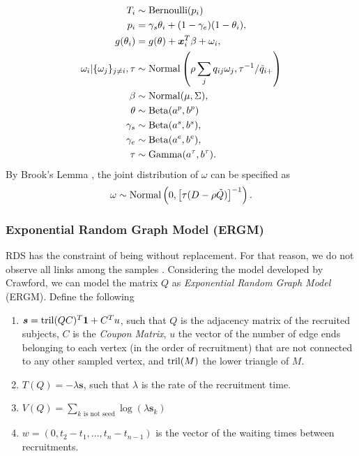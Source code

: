 \begin{equation}
  \begin{aligned}
    T_i &\sim \operatorname{Bernoulli}(p_i) \\
    p_i &= \gamma_s\theta_i + (1-\gamma_e)(1 - \theta_i),  \\
    g(\theta_i) &= g(\theta) + \boldsymbol{x}_i^T\beta + \omega_i,  \\
    \omega_i|\{\omega_j\}_{j\neq i}, \tau &\sim \operatorname{Normal}\left(\rho\sum_j q_{ij}\omega_j, \tau^{-1}/\tilde{q}_{i+}\right) \\
    \beta &\sim \operatorname{Normal}(\mu, \Sigma), \\ 
    \theta &\sim \operatorname{Beta}(a^p, b^p) \\
    \gamma_s &\sim \operatorname{Beta}(a^s, b^s), \\
    \gamma_e &\sim \operatorname{Beta}(a^e, b^e), \\  
    \tau &\sim \operatorname{Gamma}(a^{\tau}, b^{\tau}).
  \end{aligned}  
\end{equation}
By Brook's Lemma \cite[]{brook1964distinction}, the joint distribution of
$\omega$ can be specified as 
$$
\omega \sim \operatorname{Normal}\left(0, \left[\tau (D - \rho \tilde{Q})\right]^{-1}\right).
$$

\subsubsection{Exponential Random Graph Model (ERGM)}

RDS has the constraint of being without replacement. For that reason, we do
not observe all links among the samples \cite[]{crawford2016}. Considering the
model developed by Crawford, we can model the
matrix $Q$ as {\em Exponential Random Graph Model} (ERGM). Define the
following 

\begin{enumerate}
  \item $\boldsymbol{s} = \operatorname{tril}(QC)^T \boldsymbol{1} + C^Tu$, such that $Q$ is the
  adjacency matrix of the recruited subjects, $C$ is the {\em Coupon Matrix},
  $u$ the vector of the number of edge ends belonging to each vertex
  (in the order of recruitment) that are not connected to any other sampled
  vertex, and $\operatorname{tril}(M)$ the lower triangle of $M$. 

  \item $T(Q) = -\lambda \boldsymbol{s}$, such that $\lambda$ is the rate of
  the recruitment time. 

  \item $V(Q) = \sum_{k \text{ is not seed}} \log(\lambda \boldsymbol{s}_k)$
  
  \item $w = (0, t_2 - t_1, ..., t_n - t_{n-1})$ is the vector of the waiting times between
  recruitments.  
\end{enumerate}

